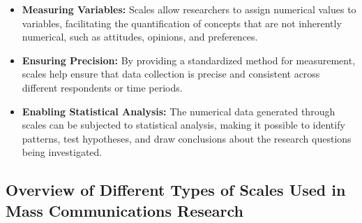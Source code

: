 \documentclass[
]{book}
\providecommand{\tightlist}{%
  \setlength{\itemsep}{0pt}\setlength{\parskip}{0pt}}
\begin{document}
\begin{itemize}
\tightlist
\item
  \textbf{Measuring Variables:} Scales allow researchers to assign numerical values to variables, facilitating the quantification of concepts that are not inherently numerical, such as attitudes, opinions, and preferences.
\item
  \textbf{Ensuring Precision:} By providing a standardized method for measurement, scales help ensure that data collection is precise and consistent across different respondents or time periods.
\item
  \textbf{Enabling Statistical Analysis:} The numerical data generated through scales can be subjected to statistical analysis, making it possible to identify patterns, test hypotheses, and draw conclusions about the research questions being investigated.
\end{itemize}

\hypertarget{overview-of-different-types-of-scales-used-in-mass-communications-research}{%
\subsection*{Overview of Different Types of Scales Used in Mass Communications Research}\label{overview-of-different-types-of-scales-used-in-mass-communications-research}}
\end{document}
